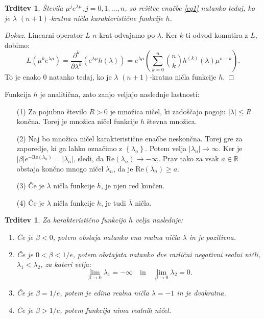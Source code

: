 \documentclass[12pt,a4paper]{amsart}
\theoremstyle{definition} %
\theoremstyle{plain} %
\newtheorem{trditev}[definicija]{Trditev}
\newcommand{\R}{\mathbb R}
\begin{document}
\begin{trditev}
    Števila $\mu^{j}e^{\lambda \mu}, j=0,1,\dots,n$, so rešitve enačbe \eqref{eq1} natanko
    tedaj, ko je $\lambda$ $(n+1)$-kratna ničla karakteristične funkcije $h$.
\end{trditev}

\begin{proof}[Dokaz]
    Linearni operator $L$ $n$-krat odvajamo po $\lambda$. Ker $k$-ti odvod komutira z $L$, dobimo:
    \[L(\mu^{k}e^{\lambda\mu})=\frac{\partial^k}{\partial\lambda^k}(e^{\lambda\mu}h(\lambda))
    =e^{\lambda\mu}\left(\sum_{k=0}^{n}\binom{n}{k}h^{(k)}(\lambda)\mu^{n-k}\right). \]
    To je enako 0 natanko tedaj, ko je $\lambda$ $(n+1)$-kratna ničla funkcije $h$.
\end{proof}

\noindent Funkcija $h$ je analitična, zato zanjo veljajo naslednje lastnosti:
\begin{enumerate}
    \item[(1)] Za pojubno število $R > 0$ je množica ničel, ki zadoščajo pogoju $|\lambda|\leq R$ končna. Torej je
            množica ničel funkcije $h$ števna množica.
    \item[(2)] Naj bo množica ničel karakteristične enačbe neskončna. 
    Torej gre za zaporedje, ki ga lahko označimo z $\left\{\lambda_n\right\}$. Potem velja
    $|\lambda_{n}| \to \infty$. Ker je $|\beta|e^{-\text{Re}(\lambda_{n})}=|\lambda_n|$, sledi, da
    $\text{Re}(\lambda_n) \to -\infty$. Prav tako za vsak $a \in \R$ obstaja končno mnogo ničel $\lambda_n$,
    da je $\text{Re}(\lambda_n) \geq a$. 
    \item[(3)] Če je $\lambda$ ničla funkcije $h$, je njen red končen.
    \item[(4)] Če je $\lambda$ ničla funkcije $h$, je tudi $\overline{\lambda}$ ničla.
\end{enumerate}


\begin{trditev}
    Za karakteristično funkcijo $h$ velja naslednje:
    \begin{enumerate}
        \item Če je $\beta < 0$, potem obstaja natanko ena realna ničla $\lambda$ in je pozitivna.
        \item Če je $0 < \beta < 1/e$, potem obstajata natanko dve različni negativni realni
         ničli, $\lambda_{1} < \lambda_{2}$, za kateri velja:
         \[ \lim_{\beta \to 0}\lambda_{1}=-\infty \quad \text{in} \quad \lim_{\beta \to 0}\lambda_{2}=0. \]
        \item Če je $\beta = 1/e$, potem je edina realna ničla $\lambda = -1$ in je dvakratna.
        \item Če je $\beta > 1/e$, potem funkcija nima realnih ničel.
    \end{enumerate}
\end{trditev}
\end{document}
